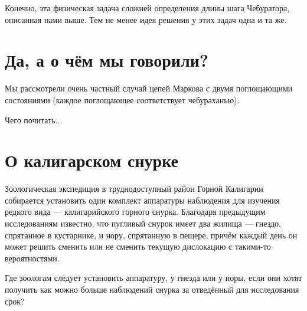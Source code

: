 \documentclass{article}
\begin{document}
Конечно, эта физическая задача сложней определения длины шага Чебуратора, описанная нами выше.
Тем не менее идея решения у этих задач одна и та же.



\section{Да, а о чём мы говорили?}

Мы рассмотрели очень частный случай цепей Маркова с двумя поглощающими состояниями (каждое поглощающее соответствует чебураханью). 

Чего почитать...

\section{О калигарском снурке}

Зоологическая экспедиция в труднодоступный район Горной Калигарии собирается установить один комплект аппаратуры наблюдения для изучения редкого вида --- калигарийского горного снурка. 
Благодаря предыдущим исследованиям известно, что пугливый снурок имеет два жилища --- 
гнездо, спрятанное в кустарнике, 
и нору, спрятанную в пещере, 
причём каждый день он может решить сменить или не сменить текущую дислокацию с такими-то вероятностями. 

Где зоологам следует установить аппаратуру, у гнезда или у норы, если они хотят получить как можно больше наблюдений снурка за отведённый для исследования срок?
\end{document}
